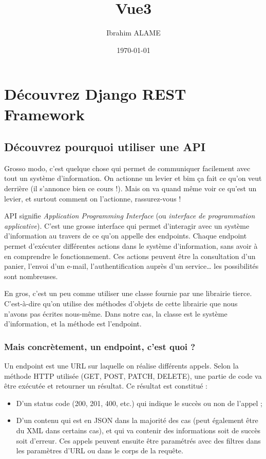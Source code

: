\documentclass[a4paper]{article}
\title{Vue3}
\author{Ibrahim ALAME}
\date{\today}
\begin{document}
 
\maketitle
 \section{Découvrez Django REST Framework}
 \subsection{Découvrez pourquoi utiliser une API}
 Grosso modo, c’est quelque chose qui permet de communiquer facilement avec tout un système d’information. On actionne un levier et bim ça fait ce qu’on veut derrière (il s’annonce bien ce cours !). Mais on va quand même voir ce qu’est un levier, et surtout comment on l’actionne, rassurez-vous !

{\color{monOrange}API} signifie {\em Application Programming Interface} (ou {\em interface de programmation applicative}). C’est une grosse interface qui permet d'interagir avec un système d’information au travers de ce qu’on appelle des endpoints. Chaque endpoint permet d’exécuter différentes actions dans le système d’information, sans avoir à en comprendre le fonctionnement. Ces actions peuvent être la consultation d’un panier, l’envoi d’un e-mail, l’authentification auprès d’un service… les possibilités sont nombreuses.
\begin{theorem}
En gros, c’est un peu comme utiliser une classe fournie par une librairie tierce. C’est-à-dire qu’on utilise des méthodes d'objets de cette librairie que nous n’avons pas écrites nous-même. Dans notre cas, la classe est le système d’information, et la méthode est l'endpoint.
\end{theorem}
\subsubsection*{Mais concrètement, un endpoint, c’est quoi ?}
Un endpoint est une URL sur laquelle on réalise différents appels. Selon la méthode HTTP utilisée (GET, POST, PATCH, DELETE), une partie de code va être exécutée et retourner un résultat. Ce résultat est constitué :
\begin{itemize}
\item D’un status code (200, 201, 400, etc.) qui indique le succès ou non de l’appel ;
\item D’un contenu qui est en JSON dans la majorité des cas (peut également être du XML dans certains cas), et qui va contenir des informations soit de succès soit d’erreur.
Ces appels peuvent ensuite être paramétrés avec des filtres dans les paramètres d’URL ou dans le corps de la requête.
\end{itemize}
\end{document}
